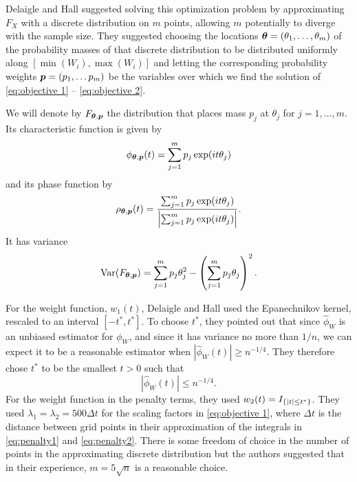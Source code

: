 	Delaigle and Hall \cite{Delaigle2016-la} suggested solving this optimization problem by approximating $F_X$ with a discrete distribution on $m$ points, allowing $m$ potentially to diverge with the sample size. They suggested choosing the locations ${\bm{{\theta}}} = (\theta_1, \dots, \theta_m)$ of the probability masses of that discrete distribution to be distributed uniformly along $[\min(W_i), \max(W_i)]$ and letting the corresponding probability weights ${\bm{{p}}} = (p_1, \dots p_m)$ be the variables over which we find the solution of \eqref{eq:objective 1} -- \eqref{eq:objective 2}. 

	We will denote by $F_{{\bm{{\theta}}}, {\bm{{p}}}}$ the distribution that places mass $p_j$ at $\theta_j$ for $j = 1,\dots, m$. Its characteristic function is given by
	\begin{equation}
		\phi_{{\bm{{\theta}}}, {\bm{{p}}}}(t) = \sum_{j = 1}^m p_j \exp(it\theta_j)
	\end{equation}
	and its phase function by
	\begin{equation}
		\rho_{{\bm{{\theta}}}, {\bm{{p}}}}(t) = \frac{ \sum_{j = 1}^m p_j \exp(it\theta_j)}{\left| \sum_{j = 1}^m p_j \exp(it\theta_j)\right|}.
	\end{equation}
	It has variance
	\begin{equation}
		\mathrm{Var}(F_{{\bm{{\theta}}}, {\bm{{p}}}}) = \sum_{j = 1}^m p_j \theta_j^2 - \left( \sum_{j=1}^m p_j \theta_j \right)^2.
	\end{equation}

	For the weight function, $w_1(t)$, Delaigle and Hall \cite{Delaigle2016-la} used the Epanechnikov kernel, rescaled to an interval $[-t^*, t^*]$. To choose $t^*$, they pointed out that since $\hat{\phi}_W$ is an unbiased estimator for $\phi_W$, and since it has variance no more than $1/n$, we can expect it to be a reasonable estimator when $|\hat{\phi}_W(t)| \geq n^{-1/4}$. They therefore chose $t^*$ to be the smallest $t > 0$ such that 
	\begin{equation}
	\label{eq:define t star}
		\left|\hat{\phi}_W(t)\right| \leq n^{-1/4}.
	\end{equation}
	For the weight function in the penalty terms, they used $w_2(t) = I_{\{|t| \leq t^*\}}$. They used $\lambda_1 = \lambda_2 = 500 \Delta t$ for the scaling factors in \eqref{eq:objective 1}, where $\Delta t$ is the distance between grid points in their approximation of the integrals in \eqref{eq:penalty1} and \eqref{eq:penalty2}.
	There is some freedom of choice in the number of points in the approximating discrete distribution but the authors suggested that in their experience, $m = 5\sqrt{n}$ is a reasonable choice.

